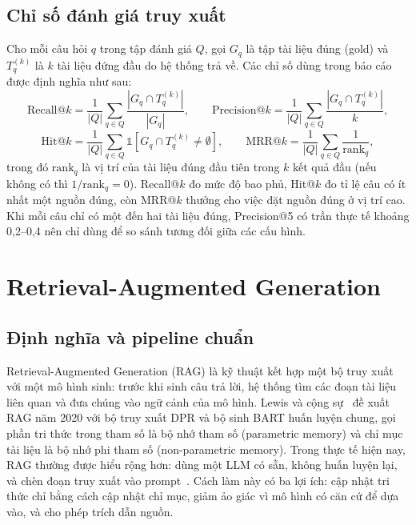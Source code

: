 \subsection{Chỉ số đánh giá truy xuất}
\label{sec:ir_metrics}

Cho mỗi câu hỏi $q$ trong tập đánh giá $Q$, gọi $G_q$ là tập tài liệu đúng (gold) và $T_q^{(k)}$ là $k$ tài liệu đứng đầu do hệ thống trả về. Các chỉ số dùng trong báo cáo được định nghĩa như sau:
\begin{equation}
    \mathrm{Recall@}k = \frac{1}{|Q|}\sum_{q \in Q} \frac{|G_q \cap T_q^{(k)}|}{|G_q|},
    \qquad
    \mathrm{Precision@}k = \frac{1}{|Q|}\sum_{q \in Q} \frac{|G_q \cap T_q^{(k)}|}{k},
    \label{eq:recall}
\end{equation}
\begin{equation}
    \mathrm{Hit@}k = \frac{1}{|Q|}\sum_{q \in Q} \mathbb{1}\!\left[G_q \cap T_q^{(k)} \neq \emptyset\right],
    \qquad
    \mathrm{MRR@}k = \frac{1}{|Q|}\sum_{q \in Q} \frac{1}{\mathrm{rank}_q},
    \label{eq:mrr}
\end{equation}
trong đó $\mathrm{rank}_q$ là vị trí của tài liệu đúng đầu tiên trong $k$ kết quả đầu (nếu không có thì $1/\mathrm{rank}_q = 0$). Recall@$k$ đo mức độ bao phủ, Hit@$k$ đo tỉ lệ câu có ít nhất một nguồn đúng, còn MRR@$k$ thưởng cho việc đặt nguồn đúng ở vị trí cao. Khi mỗi câu chỉ có một đến hai tài liệu đúng, Precision@5 có trần thực tế khoảng 0,2--0,4 nên chỉ dùng để so sánh tương đối giữa các cấu hình.

\section{Retrieval-Augmented Generation}
\label{sec:rag}

\subsection{Định nghĩa và pipeline chuẩn}
\label{sec:rag_def}

Retrieval-Augmented Generation (RAG) là kỹ thuật kết hợp một bộ truy xuất với một mô hình sinh: trước khi sinh câu trả lời, hệ thống tìm các đoạn tài liệu liên quan và đưa chúng vào ngữ cảnh của mô hình. Lewis và cộng sự~\cite{lewis2020rag} đề xuất RAG năm 2020 với bộ truy xuất DPR và bộ sinh BART huấn luyện chung, gọi phần tri thức trong tham số là bộ nhớ tham số (parametric memory) và chỉ mục tài liệu là bộ nhớ phi tham số (non-parametric memory). Trong thực tế hiện nay, RAG thường được hiểu rộng hơn: dùng một LLM có sẵn, không huấn luyện lại, và chèn đoạn truy xuất vào prompt~\cite{gao2023ragsurvey}. Cách làm này có ba lợi ích: cập nhật tri thức chỉ bằng cách cập nhật chỉ mục, giảm ảo giác vì mô hình có căn cứ để dựa vào, và cho phép trích dẫn nguồn.

